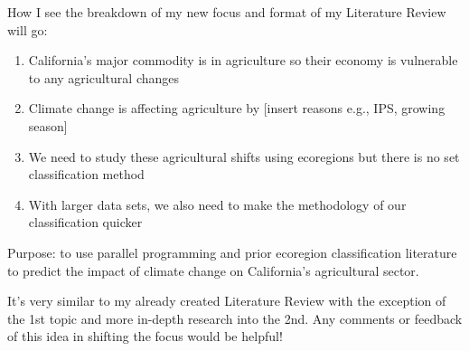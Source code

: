 \documentclass[a4paper,10pt]{article}
\begin{document}
How I see the breakdown of my new focus and format of my Literature Review will go:
\begin{enumerate}
    \item California's major commodity is in agriculture so their economy is vulnerable to any agricultural changes
    \item Climate change is affecting agriculture by [insert reasons e.g., IPS, growing season]
    \item We need to study these agricultural shifts using ecoregions but there is no set classification method
    \item With larger data sets, we also need to make the methodology of our classification quicker
\end{enumerate}

Purpose: to use parallel programming and prior ecoregion classification literature to predict the impact of climate change on California's agricultural sector.

It's very similar to my already created Literature Review with the exception of the 1st topic and more in-depth research into the 2nd. Any comments or feedback of this idea in shifting the focus would be helpful!




\end{document}
